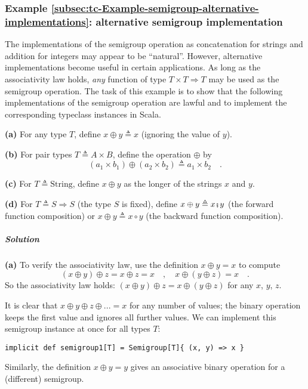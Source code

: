 \subsubsection{Example \label{subsec:tc-Example-semigroup-alternative-implementations}\ref{subsec:tc-Example-semigroup-alternative-implementations}:
alternative semigroup implementation}

The implementations of the semigroup operation as concatenation for
strings and addition for integers may appear to be ``natural''.
However, alternative implementations become useful in certain applications.
As long as the associativity law holds, \emph{any} function of type
$T\times T\Rightarrow T$ may be used as the semigroup operation.
The task of this example is to show that the following implementations
of the semigroup operation are lawful and to implement the corresponding
typeclass instances in Scala.

\textbf{(a)} For any type $T$, define $x\oplus y\triangleq x$ (ignoring
the value of $y$).

\textbf{(b)} For pair types $T\triangleq A\times B$, define the operation
$\oplus$ by
\[
\left(a_{1}\times b_{1}\right)\oplus\left(a_{2}\times b_{2}\right)\triangleq a_{1}\times b_{2}\quad.
\]

\textbf{(c)} For $T\triangleq\text{String}$, define $x\oplus y$
as the longer of the strings $x$ and $y$.

\textbf{(d)} For $T\triangleq S\Rightarrow S$ (the type $S$ is fixed),
define $x\oplus y\triangleq x\bef y$ (the forward function composition)
or $x\oplus y\triangleq x\circ y$ (the backward function composition).

\subparagraph{Solution}

\textbf{(a)} To verify the associativity law, use the definition $x\oplus y=x$
to compute 
\[
\left(x\oplus y\right)\oplus z=x\oplus z=x\quad,\quad x\oplus\left(y\oplus z\right)=x\quad.
\]
So the associativity law holds: $\left(x\oplus y\right)\oplus z=x\oplus\left(y\oplus z\right)$
for any $x$, $y$, $z$.

It is clear that $x\oplus y\oplus z\oplus...=x$ for any number of
values; the binary operation keeps the first value and ignores all
further values. We can implement this semigroup instance at once for
all types $T$:
\begin{lstlisting}
implicit def semigroup1[T] = Semigroup[T]{ (x, y) => x }
\end{lstlisting}
Similarly, the definition $x\oplus y=y$ gives an associative binary
operation for a (different) semigroup.

